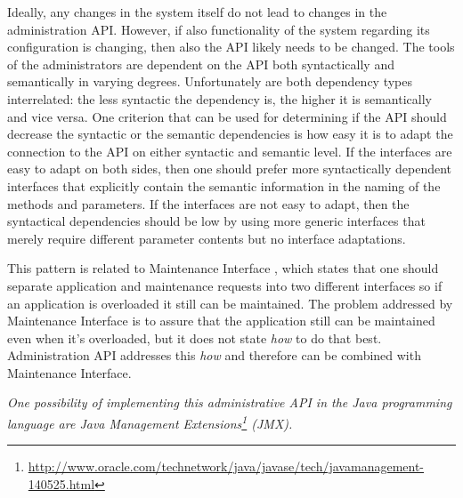 Ideally, any changes in the system itself do not lead to changes in the administration API. However, if also functionality of the system regarding its configuration is changing, then also the API likely needs to be changed. The tools of the administrators are dependent on the API both syntactically and semantically in varying degrees. Unfortunately are both dependency types interrelated: the less syntactic the dependency is, the higher it is semantically and vice versa. One criterion that can be used for determining if the API should decrease the syntactic or the semantic dependencies is how easy it is to adapt the connection to the API on either syntactic and semantic level. If the interfaces are easy to adapt on both sides, then one should prefer more syntactically dependent interfaces that explicitly contain the semantic information in the naming of the methods and parameters. If the interfaces are not easy to adapt, then the syntactical dependencies should be low by using more generic interfaces that merely require different parameter contents but no interface adaptations.  

This pattern is related to {\sc Maintenance Interface} \cite{Hanmer2007}, which states that one should separate application and maintenance requests into two different interfaces so if an application is overloaded it still can be maintained. The problem addressed by {\sc Maintenance Interface} is to assure that the application still can be maintained even when it's overloaded, but it does not state \textit{how} to do that best. {\sc Administration API} addresses this \textit{how} and therefore can be combined with {\sc Maintenance Interface}. 




\textit{One possibility of implementing this administrative API in the Java programming language are Java Management Extensions\footnote{\url{http://www.oracle.com/technetwork/java/javase/tech/javamanagement-140525.html}} (JMX). }
%
%
%

